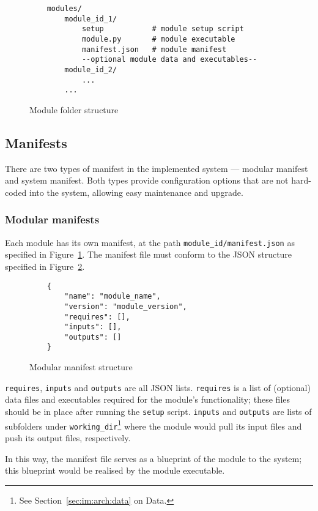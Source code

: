 \begin{figure}[ht]
\begin{lstlisting}
    modules/
        module_id_1/
            setup           # module setup script
            module.py       # module executable
            manifest.json   # module manifest
            --optional module data and executables--
        module_id_2/
            ...
        ...            
\end{lstlisting}
\caption{Module folder structure}\label{module}
\end{figure}

\subsection{Manifests}

There are two types of manifest in the implemented system --- modular manifest
and system manifest. Both types provide configuration options that are not
hard-coded into the system, allowing easy maintenance and upgrade.

\subsubsection{Modular manifests}

Each module has its own manifest, at the path \texttt{module\_id/manifest.json}
as specified in Figure~\ref{module}. The manifest file must conform to the
JSON structure specified in Figure~\ref{manifest-md}.

\begin{figure}[ht]
\begin{lstlisting}
    {
        "name": "module_name",
        "version": "module_version",
        "requires": [],
        "inputs": [],
        "outputs": []
    }
\end{lstlisting}
\caption{Modular manifest structure}\label{manifest-md}
\end{figure}

\texttt{requires}, \texttt{inputs} and \texttt{outputs} are all JSON lists.
\texttt{requires} is a list of (optional) data files and executables required
for the module's functionality; these files should be in place after running
the \texttt{setup} script. \texttt{inputs} and \texttt{outputs} are lists of
subfolders under \texttt{working\_dir}\footnote{See Section~\ref{sec:im:arch:data}
on Data.} where the module would pull its input files and push its output
files, respectively.

In this way, the manifest file serves as a blueprint of the module to the
system; this blueprint would be realised by the module executable.


